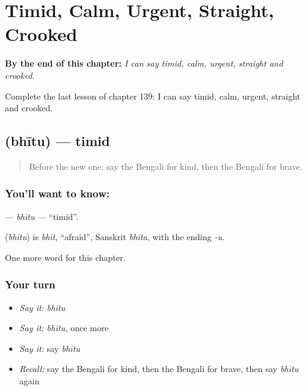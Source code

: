 
\chapter{Timid, Calm, Urgent, Straight, Crooked}
\label{ch:bn-timid-calm-urgent-straight-crooked}

\begin{chapteropening}
\textbf{By the end of this chapter:} \emph{I can say timid, calm, urgent, straight and crooked.}

Complete the last lesson of chapter 139: I can say timid, calm, urgent, straight and crooked.
\end{chapteropening}

\section[\texorpdfstring{\bn{ভীতু} (bhītu)}{ভীতু (bhītu)}]{ (bhītu) — timid}

\label{lesson:BN-C139-bhitu}



\begin{quote}
Before the new one: say the Bengali for kind, then the Bengali for brave.
\end{quote}

\subsection*{You'll want to know: }
\textbf{} — \emph{bhītu} — \textquotedblleft{}timid\textquotedblright{}.

\begin{cousinweb}
\textbf{} (\emph{bhītu}) is \emph{bhīt}, \textquotedblleft{}afraid\textquotedblright{}, Sanskrit \emph{bhīta}, with the ending \emph{-u}.
\end{cousinweb}

\begin{grammarlens}[title={What you've built}]
One more word for this chapter.
\end{grammarlens}

\subsection*{Your turn}
\begin{itemize}
\raggedright
  \item \emph{Say it:} \emph{bhītu}
  \item \emph{Say it:} \emph{bhītu}, once more
  \item \emph{Say it:} say \emph{bhītu}
  \item \emph{Recall:} say the Bengali for kind, then the Bengali for brave, then say \emph{bhītu} again
\end{itemize}

